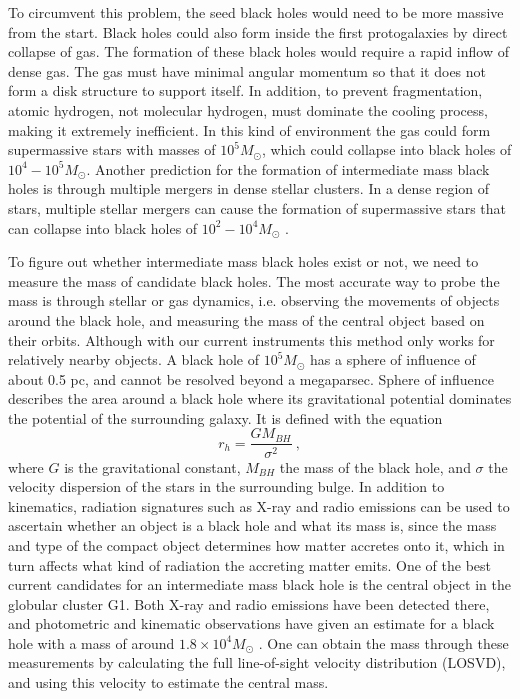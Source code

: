 \documentclass[english, oneside]{HYgradu}
\begin{document}
To circumvent this problem, the seed black holes would need to be more massive from the start. Black holes could also form inside the first protogalaxies by direct collapse of gas. The formation of these black holes would require a rapid inflow of dense gas. The gas must have minimal angular momentum so that it does not form a disk structure to support itself. In addition, to prevent fragmentation, atomic hydrogen, not molecular hydrogen, must dominate the cooling process, making it extremely inefficient. In this kind of environment the gas could form supermassive stars with masses of $10^5 M_\odot$, which could collapse into black holes of $10^4 - 10^5 M_\odot$. Another prediction for the formation of intermediate mass black holes is through multiple mergers in dense stellar clusters. In a dense region of stars, multiple stellar mergers can cause the formation of supermassive stars that can collapse into black holes of $10^2 - 10^4 M_\odot$ \citep{mezcua:2017}.

To figure out whether intermediate mass black holes exist or not, we need to measure the mass of candidate black holes. The most accurate way to probe the mass is through stellar or gas dynamics, i.e. observing the movements of objects around the black hole, and measuring the mass of the central object based on their orbits. Although with our current instruments this method only works for relatively nearby objects. A black hole of $10^5 M_\odot$ has a sphere of influence of about 0.5 pc, and cannot be resolved beyond a megaparsec. Sphere of influence describes the area around a black hole where its gravitational potential dominates the potential of the surrounding galaxy. It is defined with the equation 
\begin{equation}
r_h = \frac{G M_{BH}}{\sigma^2} \ ,
\end{equation}
where $G$ is the gravitational constant, $M_{BH}$ the mass of the black hole, and $\sigma$ the velocity dispersion of the stars in the surrounding bulge.
In addition to kinematics, radiation signatures such as X-ray and radio emissions can be used to ascertain whether an object is a black hole and what its mass is, since the mass and type of the compact object determines how matter accretes onto it, which in turn affects what kind of radiation the accreting matter emits. One of the best current candidates for an intermediate mass black hole is the central object in the globular cluster G1. Both X-ray and radio emissions have been detected there, and photometric and kinematic observations have given an estimate for a black hole with a mass of around $1.8 \times 10^4 M_\odot$ \citep{gebhardt:2005}. One can obtain the mass through these measurements by calculating the full line-of-sight velocity distribution (LOSVD), and using this velocity to estimate the central mass.
\end{document}

